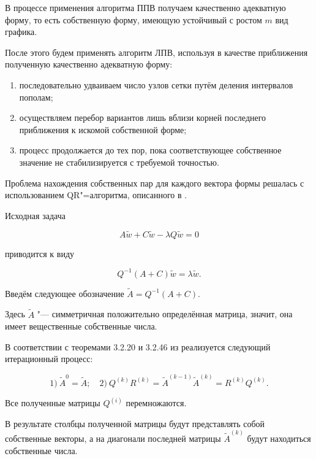 В процессе применения алгоритма ППВ получаем качественно адекватную форму, то есть собственную форму, имеющую устойчивый с ростом $m$ вид графика.



После этого будем применять алгоритм ЛПВ, используя в качестве приближения полученную качественно адекватную форму:

\begin{enumerate}

\item[j)]последовательно удваиваем число узлов сетки путём деления интервалов пополам;



\item[jj)] осуществляем перебор вариантов лишь вблизи корней последнего приближения к искомой собственной форме;



\item[jjj)] процесс продолжается до тех пор, пока соответствующее собственное значение не стабилизируется с требуемой точностью.

\end{enumerate}



Проблема нахождения собственных пар для каждого вектора формы решалась с использованием QR"=алгоритма, описанного в \cite{kor:bib:8}.



Исходная задача

$$ A\tilde{w} + C\tilde{w} - \lambda Q \tilde{w} = 0$$

приводится к виду

$$Q^{-1}(A+C)\tilde{w}=\lambda\tilde{w}.$$



Введём следующее обозначение $\tilde{A}=Q^{-1}(A+C)$. 

Здесь $\tilde{A}$ "--- симметричная положительно определённая матрица, значит, она имеет вещественные собственные числа.



В соответствии с теоремами 3.2.20 и 3.2.46 из \cite{kor:bib:7} реализуется следующий итерационный процесс:

$$1)~\tilde{A}^0=\tilde{A}; \quad 2)~Q^{(k)}R^{(k)}=\tilde{A}^{(k-1)} \tilde{A}^{(k)}=R^{(k)}Q^{(k)}.$$

Все полученные матрицы $Q^{(i)}$ перемножаются. 

В результате столбцы полученной матрицы будут представлять собой собственные векторы, а на диагонали последней матрицы $\tilde{A}^{(k)}$ будут находиться собственные числа.



